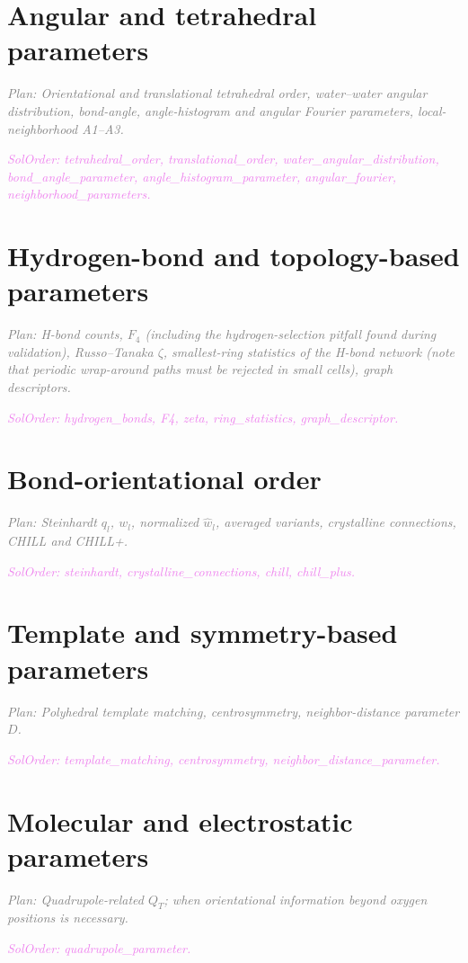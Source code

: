 \documentclass{template1}
\newcommand{\plan}[1]{\par\noindent\textcolor{gray}{\textit{Plan: #1}}\par}
\newcommand{\code}[1]{\par\noindent\textcolor{violet}{\textit{SolOrder: #1}}\par}
\begin{document}
\section{Angular and tetrahedral parameters}
\plan{Orientational and translational tetrahedral order, water--water angular
distribution, bond-angle, angle-histogram and angular Fourier parameters,
local-neighborhood A1--A3.}
\code{tetrahedral\_order, translational\_order, water\_angular\_distribution,
bond\_angle\_parameter, angle\_histogram\_parameter, angular\_fourier,
neighborhood\_parameters.}

\section{Hydrogen-bond and topology-based parameters}
\plan{H-bond counts, $F_4$ (including the hydrogen-selection pitfall found
during validation), Russo--Tanaka $\zeta$, smallest-ring statistics of the
H-bond network (note that periodic wrap-around paths must be rejected in
small cells), graph descriptors.}
\code{hydrogen\_bonds, F4, zeta, ring\_statistics, graph\_descriptor.}

\section{Bond-orientational order}
\plan{Steinhardt $q_l$, $w_l$, normalized $\hat w_l$, averaged variants,
crystalline connections, CHILL and CHILL+.}
\code{steinhardt, crystalline\_connections, chill, chill\_plus.}

\section{Template and symmetry-based parameters}
\plan{Polyhedral template matching, centrosymmetry, neighbor-distance
parameter $D$.}
\code{template\_matching, centrosymmetry, neighbor\_distance\_parameter.}

\section{Molecular and electrostatic parameters}
\plan{Quadrupole-related $Q_T$; when orientational information beyond
oxygen positions is necessary.}
\code{quadrupole\_parameter.}
\end{document}
